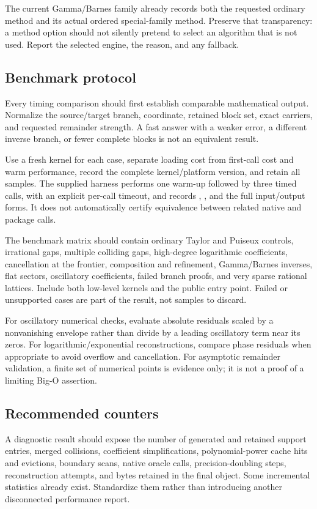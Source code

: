 \documentclass[11pt,a4paper]{article}
\newcommand{\code}[1]{\texttt{\detokenize{#1}}}
\theoremstyle{remark}\newtheorem{remark}[proposition]{Remark}
\begin{document}
The current Gamma/Barnes family already records both the requested ordinary method and its actual ordered special-family method. Preserve that transparency: a method option should not silently pretend to select an algorithm that is not used. Report the selected engine, the reason, and any fallback.\cite{gamma}

\subsection{Benchmark protocol}
Every timing comparison should first establish comparable mathematical output. Normalize the source/target branch, coordinate, retained block set, exact carriers, and requested remainder strength. A fast answer with a weaker error, a different inverse branch, or fewer complete blocks is not an equivalent result.

Use a fresh kernel for each case, separate loading cost from first-call cost and warm performance, record the complete kernel/platform version, and retain all samples. The supplied harness performs one warm-up followed by three timed calls, with an explicit per-call timeout, and records \code{ByteCount}, \code{LeafCount}, and the full input/output forms. It does not automatically certify equivalence between related native and package calls.

The benchmark matrix should contain ordinary Taylor and Puiseux controls, irrational gaps, multiple colliding gaps, high-degree logarithmic coefficients, cancellation at the frontier, composition and refinement, Gamma/Barnes inverses, flat sectors, oscillatory coefficients, failed branch proofs, and very sparse rational lattices. Include both low-level kernels and the public entry point. Failed or unsupported cases are part of the result, not samples to discard.

For oscillatory numerical checks, evaluate absolute residuals scaled by a nonvanishing envelope rather than divide by a leading oscillatory term near its zeros. For logarithmic/exponential reconstructions, compare phase residuals when appropriate to avoid overflow and cancellation. For asymptotic remainder validation, a finite set of numerical points is evidence only; it is not a proof of a limiting Big-O assertion.

\subsection{Recommended counters}
A diagnostic result should expose the number of generated and retained support entries, merged collisions, coefficient simplifications, polynomial-power cache hits and evictions, boundary scans, native oracle calls, precision-doubling steps, reconstruction attempts, and bytes retained in the final object. Some incremental statistics already exist. Standardize them rather than introducing another disconnected performance report.\cite{incremental}
\end{document}
